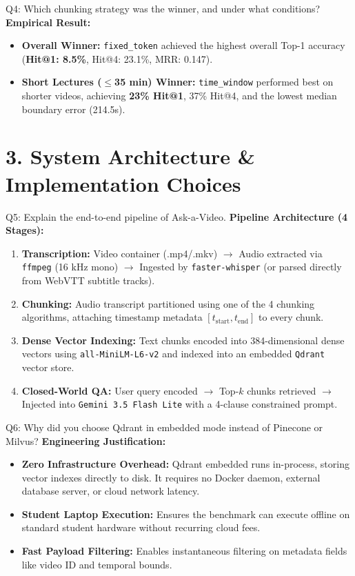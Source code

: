 \documentclass[10pt,a4paper]{article}
\begin{document}
\begin{quesbox}{Q4: Which chunking strategy was the winner, and under what conditions?}
\textbf{Empirical Result:}
\begin{itemize}[leftmargin=*]
    \item \textbf{Overall Winner:} \texttt{fixed\_token} achieved the highest overall Top-1 accuracy (\textbf{Hit@1: 8.5\%}, Hit@4: 23.1\%, MRR: 0.147).
    \item \textbf{Short Lectures ($\le$35 min) Winner:} \texttt{time\_window} performed best on shorter videos, achieving \textbf{23\% Hit@1}, 37\% Hit@4, and the lowest median boundary error (214.5s).
\end{itemize}
\end{quesbox}

\section*{\color{primary} 3. System Architecture \& Implementation Choices}

\begin{quesbox}{Q5: Explain the end-to-end pipeline of Ask-a-Video.}
\textbf{Pipeline Architecture (4 Stages):}
\begin{enumerate}[leftmargin=*]
    \item \textbf{Transcription:} Video container (.mp4/.mkv) $\rightarrow$ Audio extracted via \texttt{ffmpeg} (16 kHz mono) $\rightarrow$ Ingested by \texttt{faster-whisper} (or parsed directly from WebVTT subtitle tracks).
    \item \textbf{Chunking:} Audio transcript partitioned using one of the 4 chunking algorithms, attaching timestamp metadata $[t_{\text{start}}, t_{\text{end}}]$ to every chunk.
    \item \textbf{Dense Vector Indexing:} Text chunks encoded into 384-dimensional dense vectors using \texttt{all-MiniLM-L6-v2} and indexed into an embedded \texttt{Qdrant} vector store.
    \item \textbf{Closed-World QA:} User query encoded $\rightarrow$ Top-$k$ chunks retrieved $\rightarrow$ Injected into \texttt{Gemini 3.5 Flash Lite} with a 4-clause constrained prompt.
\end{enumerate}
\end{quesbox}

\begin{quesbox}{Q6: Why did you choose Qdrant in embedded mode instead of Pinecone or Milvus?}
\textbf{Engineering Justification:}
\begin{itemize}[leftmargin=*]
    \item \textbf{Zero Infrastructure Overhead:} Qdrant embedded runs in-process, storing vector indexes directly to disk. It requires no Docker daemon, external database server, or cloud network latency.
    \item \textbf{Student Laptop Execution:} Ensures the benchmark can execute offline on standard student hardware without recurring cloud fees.
    \item \textbf{Fast Payload Filtering:} Enables instantaneous filtering on metadata fields like video ID and temporal bounds.
\end{itemize}
\end{quesbox}
\end{document}
